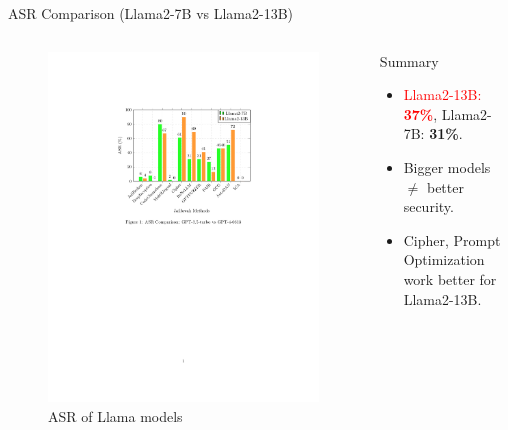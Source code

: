 \documentclass{beamer}
\begin{document}
\begin{frame}{ASR Comparison (Llama2-7B vs Llama2-13B)}
    \begin{columns}
        \begin{figure}[ht]
            \centering
            \includegraphics[width=\linewidth]{pic/Llama_comparison.pdf}
            \caption{ASR of Llama models}
            \label{fig:asr_plot_Llama}
        \end{figure}
        \pause
            \begin{block}{Summary}
            \begin{itemize}
                \item \textcolor{red}{Llama2-13B:       \textbf{37\%}},  \textcolor{myGreenTextColor}{Llama2-7B: \textbf{31\%}}.\pause
                \item Bigger models $\neq$ better security.\pause
                \item Cipher, Prompt Optimization work better for \textcolor{myGreenTextColor}{Llama2-13B}.
            \end{itemize}
        \end{block}        
    \end{columns}
\end{frame}
\end{document}
